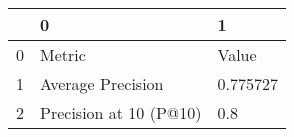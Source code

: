 \begin{tabular}{lll}
\toprule
{} &                       0 &         1 \\
\midrule
0 &                  Metric &     Value \\
1 &       Average Precision &  0.775727 \\
2 &  Precision at 10 (P@10) &       0.8 \\
\bottomrule
\end{tabular}
